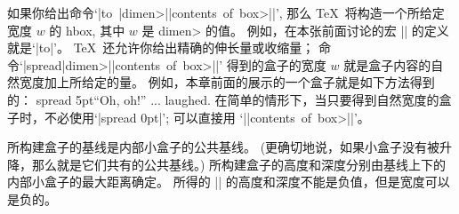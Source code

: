 \danger 如果你给出命令`\hbox{|\hbox to |\<dimen>|{|\<contents of box>|}|}',
那么 \TeX\ 将构造一个所给定宽度 $w$ 的 hbox, 其中 $w$ 是 \<dimen> 的值。%
例如，在本张前面讨论的宏 |\line| 的定义就是`|\hbox to\hsize|'。%
\TeX\ 还允许你给出精确的伸长量或收缩量；
命令`\hbox{|\hbox spread|\<dimen>|{|\<contents of box>|}|}'%
得到的盒子的宽度 $w$ 就是盒子内容的自然宽度加上所给定的量。%
例如，本章前面的展示的一个盒子就是如下方法得到的：
\begintt
\hbox spread 5pt{``Oh, oh!'' ... laughed.}
\endtt
在简单的情形下，当只要得到自然宽度的盒子时，不必使用`|\hbox spread 0pt|';
可以直接用 `|\hbox{|\<contents of box>|}|'。

\danger 所构建盒子的基线是内部小盒子的公共基线。%
(更确切地说，如果小盒子没有被升降，那么就是它们共有的公共基线。)
所构建盒子的高度和深度分别由基线上下的内部小盒子的最大距离确定。%
所得的 |\hbox| 的高度和深度不能是负值，但是宽度可以是负的。

